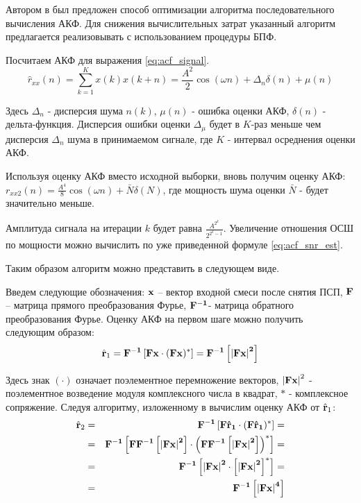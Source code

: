 Автором в \cite{my_acf} был предложен способ оптимизации алгоритма последовательного вычисления АКФ.
Для снижения вычислительных затрат указанный алгоритм предлагается реализовывать с использованием процедуры БПФ. 

Посчитаем АКФ для выражения \ref{eq:acf_signal}.
\begin{equation}
	\label{eq:lpc_akf_n}
	\hat{r}_{xx}(n) = \sum \limits_{k=1}^{K} x(k)x(k+n) = \frac{A^2}{2} \cos{(\omega{n})} + \Delta_n \delta{(n)} + \mu{(n)}
\end{equation}

Здесь ${\Delta_n}$ - дисперсия шума ${n(k)}$, ${\mu{(n)}}$ - ошибка оценки АКФ, ${\delta{(n)}}$ - дельта-функция. Дисперсия ошибки
оценки ${\Delta_{\mu}}$ будет в ${K}$-раз меньше чем дисперсия ${\Delta_n}$ шума в принимаемом сигнале, где ${K}$ - интервал
осреднения оценки АКФ.

Используя оценку АКФ вместо исходной выборки, вновь получим оценку АКФ:
${r_{xx2}(n) = \frac{A^4}{8} \cos{(\omega n)} + \bar{N} \delta{(N)}}$,
где мощность шума оценки ${\bar{N}}$ - будет значительно меньше.

Амплитуда сигнала на итерации ${k}$ будет равна ${\frac{A^{2^k}}{2^{2^k-1}}}$. Увеличение отношения ОСШ по мощности можно
вычислить по уже приведенной формуле \ref{eq:acf_snr_est}. 

Таким образом алгоритм можно представить в следующем виде.

Введем следующие обозначения: ${\bf{x}}$ – вектор входной смеси после снятия ПСП, ${\bf{F}}$ – матрица прямого преобразования Фурье,
${\bf{F}^{-1}}$- матрица обратного преобразования Фурье.  Оценку АКФ на первом шаге можно получить следующим образом:
\begin{equation}
	\label{eq:akf_1}
	\hat{\bf{r}}_1 = \bf{F}^{-1}\left[ \bf{Fx} \cdot (\bf{Fx})^* \right] = \bf{F}^{-1} \left[ \left| \bf{Fx} \right| ^2 \right]
\end{equation}

Здесь знак ${(\cdot)}$  означает поэлементное перемножение векторов, ${\left| \bf{Fx} \right| ^2}$ - поэлементное возведение модуля комплексного числа в квадрат, ${*}$ -
комплексное сопряжение.  Следуя алгоритму, изложенному в \cite{ostanin_akf} вычислим оценку АКФ от ${\hat{\bf{r}}_1}$:
\begin{eqnarray}
	\label{eq:akf_2}
	\hat{\bf{r}}_2 & = & \bf{F}^{-1}\left[ \bf{F} \hat{\bf{r}}_1 \cdot (\bf{F} \hat{\bf{r}}_1)^* \right] = \nonumber \\
		& = & \bf{F}^{-1}	\left[ 
				\bf{FF}^{-1} \left[
						\left| \bf{Fx} \right| ^2
					\right]
						\cdot \left( \bf{FF}^{-1} \left[ \left| \bf{Fx} \right| ^2 \right]
					\right) ^*
			\right] = \nonumber \\
		& = & \bf{F}^{-1} \left[ \left| \bf{Fx} \right| ^2 \cdot \left[ \left| \bf{Fx} \right| ^2 \right] ^* \right] =  \nonumber \\
		& = & \bf{F}^{-1} \left[ \left| \bf{Fx} \right| ^4 \right]
\end{eqnarray}

